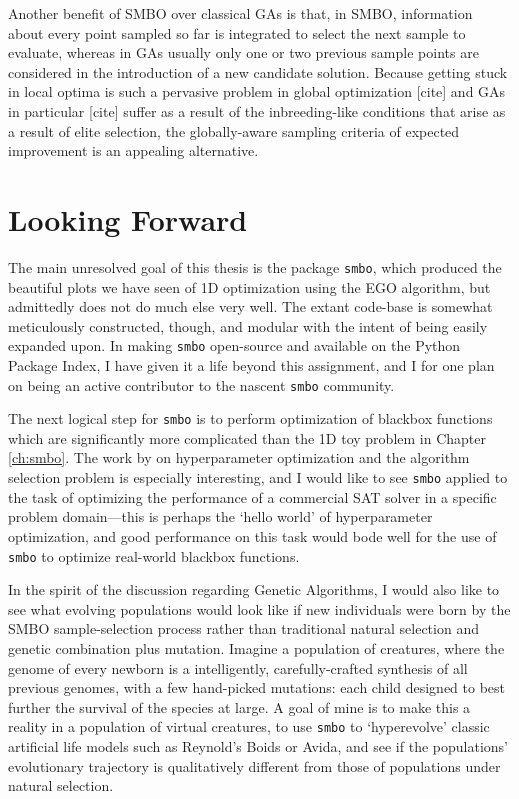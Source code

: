 Another benefit of SMBO over classical GAs is that, in SMBO, information about every point sampled so far is integrated to select the next sample to evaluate, whereas in GAs usually only one or two previous sample points are considered in the introduction of a new candidate solution. Because getting stuck in local optima is such a pervasive problem in global optimization [cite] and GAs in particular [cite] suffer as a result of the inbreeding-like conditions that arise as a result of elite selection, the globally-aware sampling criteria of expected improvement is an appealing alternative.

\section{Looking Forward}

The main unresolved goal of this thesis is the package \texttt{smbo}, which produced the beautiful plots we have seen of 1D optimization using the EGO algorithm, but admittedly does not do much else very well. The extant code-base is somewhat meticulously constructed, though, and modular with the intent of being easily expanded upon. In making \texttt{smbo} open-source and available on the Python Package Index, I have given it a life beyond this assignment, and I for one plan on being an active contributor to the nascent \texttt{smbo} community.

The next logical step for \texttt{smbo} is to perform optimization of blackbox functions which are significantly more complicated than the 1D toy problem in Chapter \ref{ch:smbo}. The work by \cite{hutter_automated_2009} on hyperparameter optimization and the algorithm selection problem is especially interesting, and I would like to see \texttt{smbo} applied to the task of optimizing the performance of a commercial SAT solver in a specific problem domain---this is perhaps the `hello world' of hyperparameter optimization, and good performance on this task would bode well for the use of \texttt{smbo} to optimize real-world blackbox functions.

In the spirit of the discussion regarding Genetic Algorithms, I would also like to see what evolving populations would look like if new individuals were born by the SMBO sample-selection process rather than traditional natural selection and genetic combination plus mutation. Imagine a population of creatures, where the genome of every newborn is a intelligently, carefully-crafted synthesis of all previous genomes, with a few hand-picked mutations: each child designed to best further the survival of the species at large. A goal of mine is to make this a reality in a population of virtual creatures, to use \texttt{smbo} to `hyperevolve' classic artificial life models such as Reynold's Boids or Avida, and see if the populations' evolutionary trajectory is qualitatively different from those of populations under natural selection.

